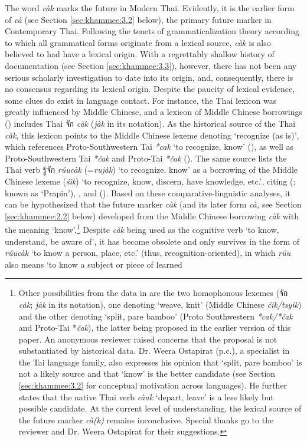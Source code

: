 \documentclass[output=paper,colorlinks,citecolor=brown]{langscibook}
\begin{document}
The word \textit{càk} marks the future in Modern Thai. Evidently, it is the earlier form of \textit{cà }(see Section \ref{sec:khammee:3.2} below), the primary future marker in Contemporary Thai. Following the tenets of grammaticalization theory according to which all grammatical forms originate from a lexical source, \textit{càk }is also believed to had have a lexical origin. With a regrettably shallow history of documentation (see Section \ref{sec:khammee:3.3}), however, there has not been any serious scholarly investigation to date into its origin, and, consequently, there is no consensus regarding its lexical origin. Despite the paucity of lexical evidence, some clues do exist in language contact. For instance, the Thai lexicon was greatly influenced by Middle Chinese, and a lexicon of Middle Chinese borrowings (\cite{SEALANG}) includes Thai \textthai{จัก} \textit{càk} (\textit{jàk} in its notation). As the historical source of the Thai \textit{càk}, this lexicon points to the Middle Chinese lexeme denoting ‘recognize (as is)’, which references Proto-Southwestern Tai \textit{*cak} ‘to recognize, know’ (\cite{Jonsson1991}), as well as Proto-Southwestern Tai \textit{*čak} and Proto-Tai \textit{*čak }(\cite{Li1977}). The same source lists the Thai verb \textthai{รู้จัก} \textit{rúucàk} (=\textit{ru}\textit{jàk}) ‘to recognize, know’ as a borrowing of the Middle Chinese lexeme  (\textit{śik}) ‘to recognize, know, discern, have knowledge, etc.’, citing \citeauthor{manomaivibool1975} (\citeyear{manomaivibool1975}; known as ‘Prapin’), \citet{baxter2000}, and \citet{Starostin} (\cite{SEALANG}). Based on these comparative-linguistic analyses, it can be hypothesized that the future marker \textit{càk} (and its later form \textit{cà, }see Section \ref{sec:khammee:2.2} below) developed from the Middle Chinese borrowing \textit{càk} with the meaning ‘know’.\footnote{Other possibilities from the data in \citeauthor{SEALANG} are the two homophonous lexemes (\textthai{จัก} \textit{càk}; \textit{jàk} in its notation), one denoting ‘weave, knit’ (Middle Chinese \textit{ćik/tsyik}) and the other denoting ‘split, pare bamboo’ (Proto Southwestern \textit{*cak/*čak} and Proto-Tai *\textit{čak}), the latter being proposed in the earlier version of this paper. An anonymous reviewer raised concerns that the proposal is not substantiated by historical data. Dr. Weera Ostapirat (p.c.), a specialist in the Tai language family, also expresses his opinion that ‘split, pare bamboo’ is not a likely source and that ‘know’ is the better candidate (see Section \ref{sec:khammee:3.2} for conceptual motivation across languages). He further states that the native Thai verb \textit{càak }‘depart, leave’ is a less likely but possible candidate. At the current level of understanding, the lexical source of the future marker \textit{cà(k)} remains inconclusive. Special thanks go to the reviewer and Dr. Weera Ostapirat for their suggestions.} Despite \textit{càk} being used as the cognitive verb ‘to know, understand, be aware of’, it has become obsolete and only survives in the form of \textit{rúucàk} ‘to know a person, place, etc.’ (thus, recognition-oriented), in which \textit{rúu} also means ‘to know a subject or piece of learned 
\end{document}
